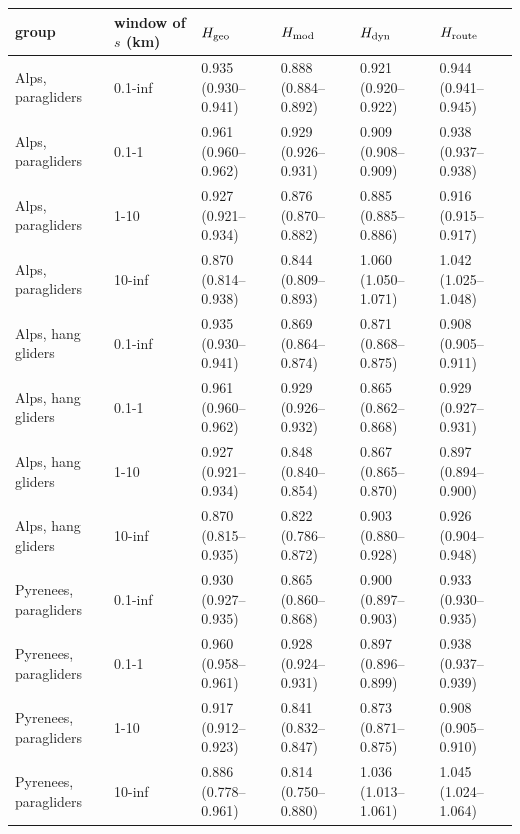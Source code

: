 \begin{tabular}{llllll}
\toprule
group & window of $s$ (km) & $H_{\mathrm{geo}}$ & $H_{\mathrm{mod}}$ & $H_{\mathrm{dyn}}$ & $H_{\mathrm{route}}$ \\
\midrule
Alps, paragliders & 0.1-inf & 0.935 (0.930--0.941) & 0.888 (0.884--0.892) & 0.921 (0.920--0.922) & 0.944 (0.941--0.945) \\
Alps, paragliders & 0.1-1 & 0.961 (0.960--0.962) & 0.929 (0.926--0.931) & 0.909 (0.908--0.909) & 0.938 (0.937--0.938) \\
Alps, paragliders & 1-10 & 0.927 (0.921--0.934) & 0.876 (0.870--0.882) & 0.885 (0.885--0.886) & 0.916 (0.915--0.917) \\
Alps, paragliders & 10-inf & 0.870 (0.814--0.938) & 0.844 (0.809--0.893) & 1.060 (1.050--1.071) & 1.042 (1.025--1.048) \\
Alps, hang gliders & 0.1-inf & 0.935 (0.930--0.941) & 0.869 (0.864--0.874) & 0.871 (0.868--0.875) & 0.908 (0.905--0.911) \\
Alps, hang gliders & 0.1-1 & 0.961 (0.960--0.962) & 0.929 (0.926--0.932) & 0.865 (0.862--0.868) & 0.929 (0.927--0.931) \\
Alps, hang gliders & 1-10 & 0.927 (0.921--0.934) & 0.848 (0.840--0.854) & 0.867 (0.865--0.870) & 0.897 (0.894--0.900) \\
Alps, hang gliders & 10-inf & 0.870 (0.815--0.935) & 0.822 (0.786--0.872) & 0.903 (0.880--0.928) & 0.926 (0.904--0.948) \\
Pyrenees, paragliders & 0.1-inf & 0.930 (0.927--0.935) & 0.865 (0.860--0.868) & 0.900 (0.897--0.903) & 0.933 (0.930--0.935) \\
Pyrenees, paragliders & 0.1-1 & 0.960 (0.958--0.961) & 0.928 (0.924--0.931) & 0.897 (0.896--0.899) & 0.938 (0.937--0.939) \\
Pyrenees, paragliders & 1-10 & 0.917 (0.912--0.923) & 0.841 (0.832--0.847) & 0.873 (0.871--0.875) & 0.908 (0.905--0.910) \\
Pyrenees, paragliders & 10-inf & 0.886 (0.778--0.961) & 0.814 (0.750--0.880) & 1.036 (1.013--1.061) & 1.045 (1.024--1.064) \\
\bottomrule
\end{tabular}
